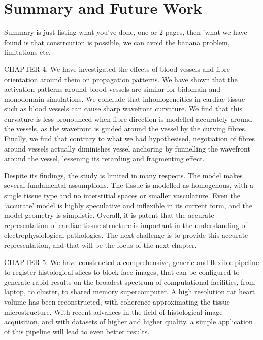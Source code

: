 \chapter{Summary and Future Work}
\dblspace

Summary is just listing what you've done, one or 2 pages, then 'what we have found is that constrcution is possible, we can avoid the banana problem, limitations etc.

  CHAPTER 4:
  We have investigated the effects of blood vessels and fibre orientation around them on propagation patterns. We have shown that the activation patterns around blood vessels are similar for bidomain and monodomain simulations. We conclude that inhomogeneities in cardiac tissue such as blood vessels can cause sharp wavefront curvature. We find that this curvature is less pronounced when fibre direction is modelled accurately around the vessels, as the wavefront is guided around the vessel by the curving fibres. Finally, we find that contrary to what we had hypothesised, negotiation of fibres around vessels actually diminishes vessel anchoring by funnelling the wavefront around the vessel, lessening its retarding and fragmenting effect.
  
  Despite its findings, the study is limited in many respects. The model makes several fundamental assumptions. The tissue is modelled as homogenous, with a single tissue type and no interstitial spaces or smaller vasculature. Even the ‘accurate’ model is highly speculative and inflexible in its current form, and the model geometry is simplistic. Overall, it is patent that the accurate representation of cardiac tissue structure is important in the understanding of electrophysiological pathologies. The next challenge is to provide this accurate representation, and that will be the focus of the next chapter.

  CHAPTER 5:
  We have constructed a comprehensive, generic and flexible pipeline to register histological slices to block face images, that can be configured to generate rapid results on the broadest spectrum of computational facilities, from laptop, to cluster, to shared memory supercomputer. A high resolution rat heart volume has been reconstructed, with coherence approximating the tissue microstructure. With recent advances in the field of histological image acquisition, and with datasets of higher and higher quality, a simple application of this pipeline will lead to even better results.
	
